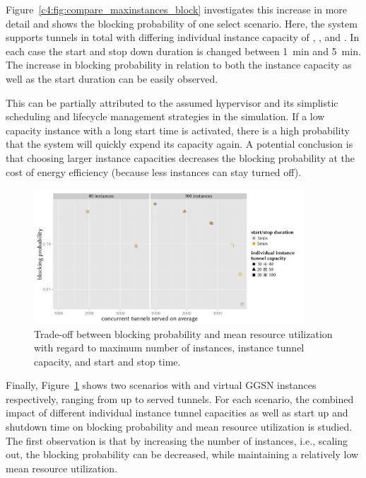 Figure~\ref{c4:fig:compare_maxinstances_block} investigates this increase in more detail and shows the blocking probability of one select scenario. Here, the system supports  tunnels in total with differing individual instance capacity of , , and . In each case the start and stop down duration is changed between \SI{1}{\minute} and \SI{5}{\minute}. The increase in blocking probability in relation to both the instance capacity as well as the start duration can be easily observed.

This can be partially attributed to the assumed hypervisor and its simplistic scheduling  and lifecycle management strategies in the simulation. If a low capacity instance with a long start time is activated, there is a high probability that the system will quickly expend its capacity again.
A potential conclusion is that choosing larger instance capacities decreases the blocking probability at the cost of energy efficiency (because less instances can stay turned off).

\begin{figure}[htbp]
	\centering
	\includegraphics[width=0.9\textwidth]{images/R-virtualized-startstop-tunnelusage-blocking-comparison.pdf}
	\caption{Trade-off between blocking probability and mean resource utilization with regard to maximum number of instances, instance tunnel capacity, and start and stop time.}
\label{c4:fig:compare_util_block}
\end{figure}

Finally, Figure~\ref{c4:fig:compare_util_block} shows two scenarios with  and  virtual \gls{GGSN} instances respectively, ranging from  up to  served tunnels. For each scenario, the combined impact of different individual instance tunnel capacities as well as start up and shutdown time on blocking probability and mean resource utilization is studied. The first observation is that by increasing the number of instances, i.e., scaling out, the blocking probability can be decreased, while maintaining a relatively low mean resource utilization. 

